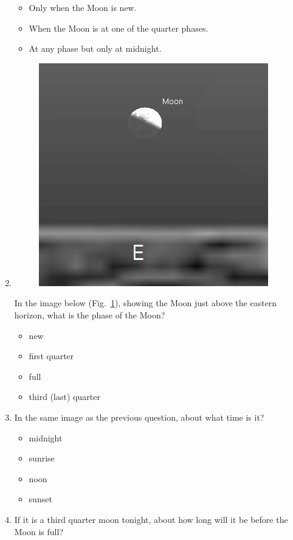 \documentclass[12pt]{article}
\begin{document}
\begin{enumerate}
\begin{itemize}
    \item Only when the Moon is new.
    \item When the Moon is at one of the quarter phases.
    \item At any phase but only at midnight.
\end{itemize}
\item%
\begin{figure}[htbp]
    \centering
    \includegraphics{l4q5.png}
    \caption{}
    \label{fig:l4q5}
\end{figure}
In the image below (Fig.~\ref{fig:l4q5}), showing the Moon just above the eastern horizon, what is the phase of the Moon?
\begin{itemize}
    \item new
    \item first quarter
    \item full
    \item third (last) quarter
\end{itemize}
\item%
In the same image as the previous question, about what time is it?
\begin{itemize}
    \item midnight
    \item sunrise
    \item noon
    \item sunset
\end{itemize}
\item
If it is a third quarter moon tonight, about how long will it be before the Moon is full?
\begin{itemize}

\end{itemize}
\end{enumerate}
\end{document}
